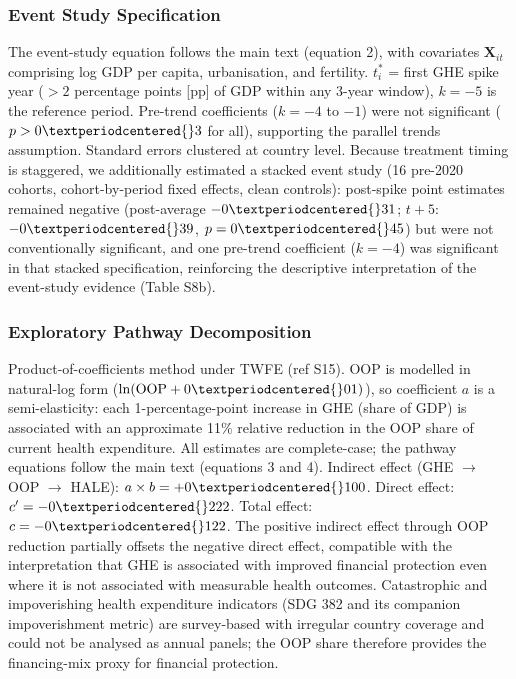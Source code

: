 \documentclass[10pt,a4paper]{article}
\begin{document}
\subsubsection{Event Study Specification}
The event-study equation follows the main text (equation 2), with covariates $\mathbf{X}_{it}$ comprising log GDP per capita, urbanisation, and fertility. $t_i^*$ = first GHE spike year ($>2$ percentage points [pp] of GDP within any 3-year window), $k = -5$ is the reference period. Pre-trend coefficients ($k = -4$ to $-1$) were not significant ($p > 0{\textperiodcentered{}}3$ for all), supporting the parallel trends assumption. Standard errors clustered at country level. Because treatment timing is staggered, we additionally estimated a stacked event study (16 pre-2020 cohorts, cohort-by-period fixed effects, clean controls): post-spike point estimates remained negative (post-average $-0{\textperiodcentered{}}31$; $t+5$: $-0{\textperiodcentered{}}39$, $p = 0{\textperiodcentered{}}45$) but were not conventionally significant, and one pre-trend coefficient ($k = -4$) was significant in that stacked specification, reinforcing the descriptive interpretation of the event-study evidence (Table S8b).

\subsubsection{Exploratory Pathway Decomposition}
Product-of-coefficients method under TWFE (ref S15). OOP is modelled in natural-log form ($\ln(\text{OOP} + 0{\textperiodcentered{}}01)$), so coefficient $a$ is a semi-elasticity: each 1-percentage-point increase in GHE (share of GDP) is associated with an approximate 11\% relative reduction in the OOP share of current health expenditure. All estimates are complete-case; the pathway equations follow the main text (equations 3 and 4).
Indirect effect (GHE $\rightarrow$ OOP $\rightarrow$ HALE): $a \times b = +0{\textperiodcentered{}}100$. Direct effect: $c' = -0{\textperiodcentered{}}222$. Total effect: $c = -0{\textperiodcentered{}}122$. The positive indirect effect through OOP reduction partially offsets the negative direct effect, compatible with the interpretation that GHE is associated with improved financial protection even where it is not associated with measurable health outcomes. Catastrophic and impoverishing health expenditure indicators (SDG 3{\textperiodcentered{}}8{\textperiodcentered{}}2 and its companion impoverishment metric) are survey-based with irregular country coverage and could not be analysed as annual panels; the OOP share therefore provides the financing-mix proxy for financial protection.
\end{document}
